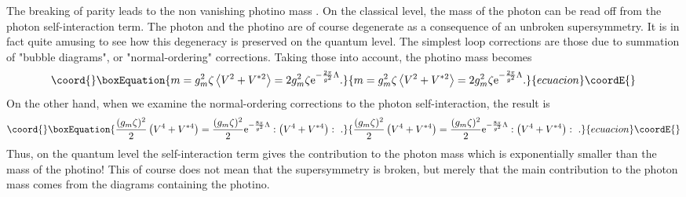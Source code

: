 \documentclass[a4paper,12pt]{article}
\begin{document}
The breaking of parity leads to the non vanishing photino mass
\coordHE{}. On the classical level, the mass of the photon
can be read off from the photon self-interaction term. The photon
and the photino are of course degenerate as a consequence of an
unbroken supersymmetry.  It is in fact quite amusing to see how
this degeneracy is preserved on the quantum level. The simplest
loop corrections are those due to summation of "bubble diagrams",
or "normal-ordering" corrections. Taking those into account, the
photino mass becomes
\begin{equation}\coord{}\boxEquation{
m=g_m^2\zeta \left<V^2+V^{*2}\right>=2g_m^2\zeta {\rm e}^{-{2\pi\over g^2}\Lambda}.
}{
m=g_m^2\zeta \left<V^2+V^{*2}\right>=2g_m^2\zeta {\rm e}^{-{2\pi\over g^2}\Lambda}.
}{ecuacion}\coordE{}\end{equation}
On the other hand, when we examine the normal-ordering corrections
to the photon self-interaction, the result is
\begin{equation}\coord{}\boxEquation{
{(g_m\zeta)^2\over 2}\left(V^4+V^{*4}\right)={(g_m\zeta)^2\over 2} {\rm e}^{-{8\pi
\over g^2}\Lambda}:\left(V^4+V^{*4}\right):~ .
}{
{(g_m\zeta)^2\over 2}\left(V^4+V^{*4}\right)={(g_m\zeta)^2\over 2} {\rm e}^{-{8\pi
\over g^2}\Lambda}:\left(V^4+V^{*4}\right):~ .
}{ecuacion}\coordE{}\end{equation}
Thus, on the quantum level the self-interaction term gives the
contribution to the photon mass which is exponentially smaller
than the mass of the photino! This of course does not mean that
the supersymmetry is broken, but merely that the main contribution
to the photon mass comes from the diagrams containing the photino.
\end{document}
